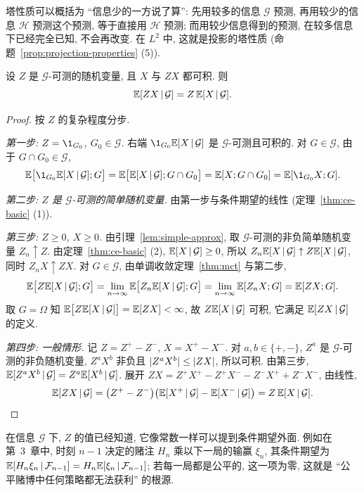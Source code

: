 \begin{intuition}
塔性质可以概括为 ``信息少的一方说了算'': 先用较多的信息 $\mathcal{G}$ 预测, 再用较少的信息 $\mathcal{H}$ 预测这个预测, 等于直接用 $\mathcal{H}$ 预测; 而用较少信息得到的预测, 在较多信息下已经完全已知, 不会再改变. 在 $L^2$ 中, 这就是投影的塔性质 (命题~\ref{prop:projection-properties} (5)).
\end{intuition}

\begin{theorem}[提出已知因子]\label{thm:take-out}
设 $Z$ 是 $\mathcal{G}$-可测的随机变量, 且 $X$ 与 $ZX$ 都可积. 则
\[
\mathbb{E}[ZX\,|\,\mathcal{G}]=Z\,\mathbb{E}[X\,|\,\mathcal{G}].
\]
\end{theorem}

\begin{proof}
按 $Z$ 的复杂程度分步.

\emph{第一步: $Z=\1_{G_0}$, $G_0\in\mathcal{G}$.} 右端 $\1_{G_0}\E[X\,|\,\mathcal{G}]$ 是 $\mathcal{G}$-可测且可积的. 对 $G\in\mathcal{G}$, 由于 $G\cap G_0\in\mathcal{G}$,
\[
\E\big[\1_{G_0}\E[X\,|\,\mathcal{G}];G\big]=\E\big[\E[X\,|\,\mathcal{G}];G\cap G_0\big]=\E[X;G\cap G_0]=\E[\1_{G_0}X;G].
\]

\emph{第二步: $Z$ 是 $\mathcal{G}$-可测的简单随机变量.} 由第一步与条件期望的线性 (定理~\ref{thm:ce-basic} (1)).

\emph{第三步: $Z\ge0$, $X\ge0$.} 由引理~\ref{lem:simple-approx}, 取 $\mathcal{G}$-可测的非负简单随机变量 $Z_n\uparrow Z$. 由定理~\ref{thm:ce-basic} (2), $\mathbb{E}[X\,|\,\mathcal{G}]\ge0$, 所以 $Z_n\mathbb{E}[X\,|\,\mathcal{G}]\uparrow Z\mathbb{E}[X\,|\,\mathcal{G}]$, 同时 $Z_nX\uparrow ZX$. 对 $G\in\mathcal{G}$, 由单调收敛定理~\ref{thm:mct} 与第二步,
\[
\mathbb{E}\big[Z\mathbb{E}[X\,|\,\mathcal{G}];G\big]=\lim_{n\to\infty}\mathbb{E}\big[Z_n\mathbb{E}[X\,|\,\mathcal{G}];G\big]=\lim_{n\to\infty}\mathbb{E}[Z_nX;G]=\mathbb{E}[ZX;G].
\]
取 $G=\Omega$ 知 $\mathbb{E}\big[Z\mathbb{E}[X\,|\,\mathcal{G}]\big]=\mathbb{E}[ZX]<\infty$, 故 $Z\mathbb{E}[X\,|\,\mathcal{G}]$ 可积, 它满足 $\mathbb{E}[ZX\,|\,\mathcal{G}]$ 的定义.

\emph{第四步: 一般情形.} 记 $Z=Z^+-Z^-$, $X=X^+-X^-$. 对 $a,b\in\{+,-\}$, $Z^a$ 是 $\mathcal{G}$-可测的非负随机变量, $Z^aX^b$ 非负且 $\lvert Z^aX^b\rvert\le\lvert ZX\rvert$, 所以可积. 由第三步, $\mathbb{E}[Z^aX^b\,|\,\mathcal{G}]=Z^a\mathbb{E}[X^b\,|\,\mathcal{G}]$. 展开 $ZX=Z^+X^+-Z^+X^--Z^-X^++Z^-X^-$, 由线性,
\[
\mathbb{E}[ZX\,|\,\mathcal{G}]=\big(Z^+-Z^-\big)\big(\mathbb{E}[X^+\,|\,\mathcal{G}]-\mathbb{E}[X^-\,|\,\mathcal{G}]\big)=Z\,\mathbb{E}[X\,|\,\mathcal{G}].\qedhere
\]
\end{proof}

\begin{intuition}
在信息 $\mathcal{G}$ 下, $Z$ 的值已经知道, 它像常数一样可以提到条件期望外面. 例如在第~3~章中, 时刻 $n-1$ 决定的赌注 $H_n$ 乘以下一局的输赢 $\xi_n$, 其条件期望为 $\mathbb{E}[H_n\xi_n\,|\,\mathcal{F}_{n-1}]=H_n\mathbb{E}[\xi_n\,|\,\mathcal{F}_{n-1}]$; 若每一局都是公平的, 这一项为零, 这就是 ``公平赌博中任何策略都无法获利'' 的根源.
\end{intuition}

